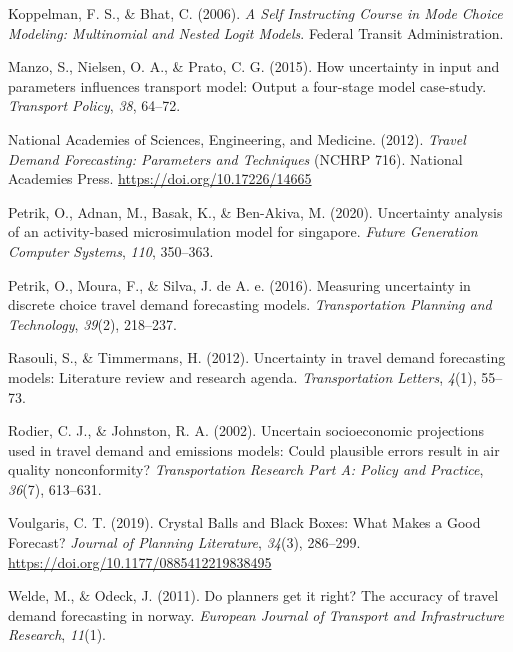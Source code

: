 \documentclass[fancy, masters, twoside]{byuthesis}
\newlength{\cslhangindent}
\newlength{\cslentryspacingunit} %
\newenvironment{CSLReferences}[2] %
 {%
  \setlength{\parindent}{0pt}
  \ifodd #1
  \let\oldpar\par
  \def\par{\hangindent=\cslhangindent\oldpar}
  \fi
  \setlength{\parskip}{#2\cslentryspacingunit}
 }%
 {}
\begin{document}
\begin{CSLReferences}{1}{0}
\leavevmode{}%
Koppelman, F. S., \& Bhat, C. (2006). \emph{A {Self Instructing Course} in {Mode Choice Modeling}: {Multinomial} and {Nested Logit Models}}. {Federal Transit Administration}.

\leavevmode{}%
Manzo, S., Nielsen, O. A., \& Prato, C. G. (2015). How uncertainty in input and parameters influences transport model: Output a four-stage model case-study. \emph{Transport Policy}, \emph{38}, 64--72.

\leavevmode{}%
National Academies of Sciences, Engineering, and Medicine. (2012). \emph{Travel {Demand Forecasting}: {Parameters} and {Techniques}} (NCHRP 716). {National Academies Press}. \url{https://doi.org/10.17226/14665}

\leavevmode{}%
Petrik, O., Adnan, M., Basak, K., \& Ben-Akiva, M. (2020). Uncertainty analysis of an activity-based microsimulation model for singapore. \emph{Future Generation Computer Systems}, \emph{110}, 350--363.

\leavevmode{}%
Petrik, O., Moura, F., \& Silva, J. de A. e. (2016). Measuring uncertainty in discrete choice travel demand forecasting models. \emph{Transportation Planning and Technology}, \emph{39}(2), 218--237.

\leavevmode{}%
Rasouli, S., \& Timmermans, H. (2012). Uncertainty in travel demand forecasting models: Literature review and research agenda. \emph{Transportation Letters}, \emph{4}(1), 55--73.

\leavevmode{}%
Rodier, C. J., \& Johnston, R. A. (2002). Uncertain socioeconomic projections used in travel demand and emissions models: Could plausible errors result in air quality nonconformity? \emph{Transportation Research Part A: Policy and Practice}, \emph{36}(7), 613--631.

\leavevmode{}%
Voulgaris, C. T. (2019). Crystal {Balls} and {Black Boxes}: {What Makes} a {Good Forecast}? \emph{Journal of Planning Literature}, \emph{34}(3), 286--299. \url{https://doi.org/10.1177/0885412219838495}

\leavevmode{}%
Welde, M., \& Odeck, J. (2011). Do planners get it right? The accuracy of travel demand forecasting in norway. \emph{European Journal of Transport and Infrastructure Research}, \emph{11}(1).


\end{CSLReferences}
\end{document}
